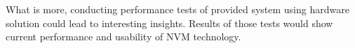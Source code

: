 What is more, conducting performance tests of provided system using hardware \PM solution could lead to interesting insights.
Results of those tests would show current performance and usability of NVM technology. 



